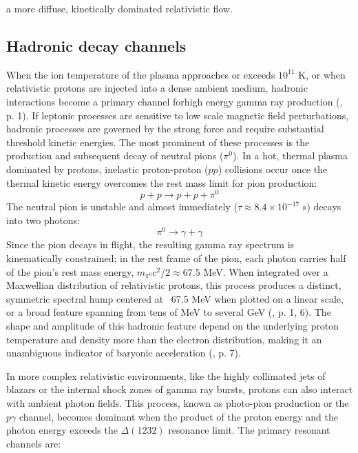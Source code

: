 \documentclass{aa} %
\begin{document}
a more diffuse, kinetically dominated relativistic flow.

\subsection{Hadronic decay channels}
When the ion temperature of the plasma approaches or exceeds $10^{11}$ K, or when relativistic protons are injected into a dense ambient medium, hadronic interactions become a primary channel forhigh energy gamma ray production (\citet{Kafexhiuetal2019}, p. 1). If leptonic processes are sensitive to low scale magnetic field perturbations, hadronic processes are governed by the strong force and require substantial threshold kinetic energies. The most prominent of these processes is the production and subsequent decay of neutral pions ($\pi^0$).
In a hot, thermal plasma dominated by protons, inelastic proton-proton ($pp$) collisions occur once the thermal kinetic energy overcomes the rest mass limit for pion production:
\begin{equation}
  p + p \rightarrow p + p + \pi^0
\end{equation}
The neutral pion is unstable and almost immediately ($\tau \approx 8.4 \times 10^{-17}$ s) decays into two photons:
\begin{equation}
  \pi^0 \rightarrow \gamma + \gamma
\end{equation}
Since the pion decays in flight, the resulting gamma ray spectrum is kinematically constrained; in the rest frame of the pion, each photon carries half of the pion's rest mass energy, $m_{\pi^0} c^2 / 2 \approx 67.5$ MeV. When integrated over a Maxwellian distribution of relativistic protons, this process produces a distinct, symmetric spectral hump centered at ~67.5 MeV when plotted on a linear scale, or a broad feature spanning from tens of MeV to several GeV (\citet{Kafexhiuetal2019}, p. 1, 6). The shape and amplitude of this hadronic feature depend on the underlying proton temperature and density more than the electron distribution, making it an unambiguous indicator of baryonic acceleration (\citet{Kafexhiuetal2019}, p. 7).

In more complex relativistic environments, like the highly collimated jets of blazars or the internal shock zones of gamma ray bursts, protons can also interact with ambient photon fields. This process, known as photo-pion production or the $p\gamma$ channel, becomes dominant when the product of the proton energy and the photon energy exceeds the $\Delta(1232)$ resonance limit. The primary resonant channels are:
\end{document}
